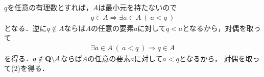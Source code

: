 	\begin{prf}
		$q$を任意の有理数とすれば，$A$は最小元を持たないので
		\begin{align}
			q \in A \Longrightarrow \exists a \in A\ (\ a < q\ )
		\end{align}
		となる．逆に$q \notin A$ならば$A$の任意の要素$a$に対して$q < a$となるから，対偶を取って
		\begin{align}
			\exists a \in A\ (\ a < q\ ) \Longrightarrow q \in A
		\end{align}
		を得る．$q \notin \mathbf{Q} \backslash A$ならば$A$の任意の要素$a$に対して$a < q$となるから，
		対偶を取って(2)を得る．
		\QED
	\end{prf}